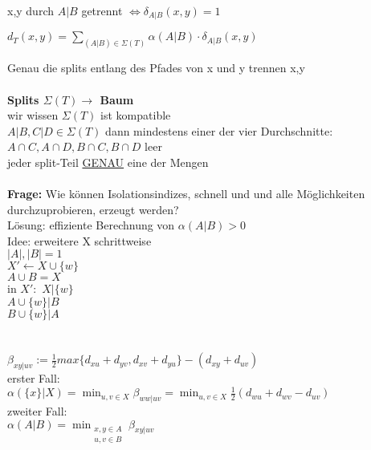 \documentclass[12pt,a4paper]{article}
\begin{document}

x,y durch $A|B$ getrennt $\Leftrightarrow \delta_{A|B}(x,y)=1$

$d_T(x,y)=\displaystyle\sum_{(A|B) \in \Sigma (T)} \alpha(A|B) \cdot \delta_{A|B}(x,y)$


Genau die splits entlang des Pfades von x und y trennen x,y
\\\\
\textbf{Splits $\Sigma(T) \rightarrow$ Baum}\\
wir wissen $\Sigma(T)$ ist kompatible\\
$A|B,C|D \in \Sigma(T)$ dann mindestens einer der vier Durchschnitte:\\ $A \cap C, A \cap D, B \cap C, B \cap D$ leer\\
jeder split-Teil \underline{GENAU} eine der Mengen\\\\
\textbf{Frage:} Wie können Isolationsindizes, schnell und und alle Möglichkeiten durchzuprobieren, erzeugt werden?\\
Lösung: effiziente Berechnung von $\alpha(A|B)>0$\\
Idee: erweitere X schrittweise\\
$|A|,|B|=1$\\
$X' \leftarrow X \cup \{w\}$\\
$A\cup B=X$\\
in $X':$
$X|\{w\}$\\
$A\cup \{w\}|B$\\
$B\cup \{w\}|A$\\
\\\\
$\beta_{xy|uv}:=\frac{1}{2}max\{d_{xu} + d_{yv}, d_{xv} + d_{yu}\} - (d_{xy} + d_{uv})$\\
erster Fall:\\
$\alpha(\{x\}|X)=\displaystyle\min_{u,v \in X}\beta_{ww|uv}=\displaystyle\min_{u,v \in X} \frac{1}{2}(d_{wu} + d_{wv} - d_{uv})$\\
zweiter Fall:\\
$\alpha(A|B)=\displaystyle\min_{\substack{x,y \in A \\ u,v \in B}}\beta_{xy|uv}$\\
\end{document}
